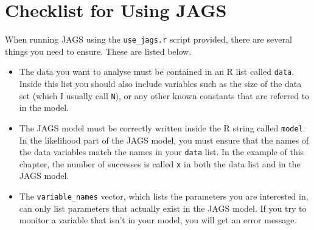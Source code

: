 \section{Checklist for Using JAGS}
When running JAGS using the {\tt use\_jags.r} script provided, there are several
things you need to ensure. These are listed below.

\begin{itemize}
\item The data you want to analyse must be contained in an R
list called {\tt data}. Inside this list you should also include variables
such as the size of the data set (which I usually call {\tt N}),
or any other known constants that are
referred to in the model.
\item The JAGS model must be correctly written inside the R string called
{\tt model}. In the likelihood part of the JAGS model, you must ensure that
the names of the data variables match the names in your {\tt data} list. In
the example of this chapter, the number of successes is called {\tt x} in both
the data list and in the JAGS model.
\item The {\tt variable\_names} vector, which lists the parameters you are
interested in, can only list parameters that actually exist in the JAGS model.
If you try to monitor a variable that isn't in your model, you will get an
error message.
\end{itemize}
